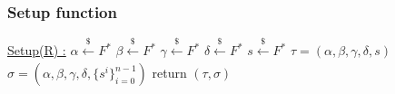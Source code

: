 \subsubsection{Setup function}
\underline{Setup(R) :}
\tabNormal $\alpha \xleftarrow[]{\$} F^*$
\tabNormal $\beta \xleftarrow[]{\$} F^*$
\tabNormal $\gamma \xleftarrow[]{\$} F^*$
\tabNormal $\delta \xleftarrow[]{\$} F^*$ 
\tabNormal $s \xleftarrow[]{\$} F^*$
\tabNormal $\tau = (\alpha, \beta,\gamma,\delta,s)$ 
\tabNormal $\sigma=(\alpha, \beta,\gamma,\delta, \{s^i\}_{i=0}^{n-1})$
\tabNormal return $(\tau, \sigma)$